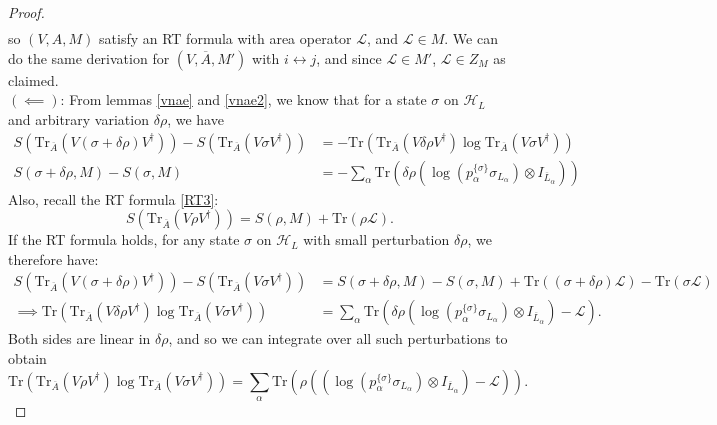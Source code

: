 \documentclass[12pt,a4paper]{report}
\numberwithin{equation}{section}
\newcommand{\ol}[1]{\overline{#1}}
\newcommand{\tr}{\text{Tr}}
\theoremstyle{definition}
\theoremstyle{theorem}
\theoremstyle{theorem}
\theoremstyle{example}
\theoremstyle{definition}
\begin{document}
\begin{proof}
\begin{equation}
\begin{aligned}
		\end{aligned}
	\end{equation}
	so $(V,A,M)$ satisfy an RT formula with area operator $\mathcal{L}$, and $\mathcal{L}\in M$. We can do the same derivation for $(V,\ol{A},M')$ with $i\leftrightarrow j$, and since $\mathcal{L}\in M'$, $\mathcal{L}\in Z_{M}$ as claimed.\\
	$(\impliedby)$: From lemmas \ref{vnae} and \ref{vnae2}, we know that for a state $\sigma$ on $\mathcal{H}_{L}$ and arbitrary variation $\delta\rho$, we have
	\begin{equation}
		\begin{aligned}
			S\left(\tr_{\ol{A}}\left(V(\sigma+\delta\rho)V^{\dagger}\right)\right)-S\left(\tr_{\ol{A}}\left(V\sigma V^{\dagger}\right)\right)&=-\tr\left(\tr_{\ol{A}}\left(V\delta\rho V^{\dagger}\right)\log \tr_{\ol{A}}\left(V\sigma V^{\dagger}\right)\right)\\
			S(\sigma+\delta\rho,M)-S(\sigma,M)&=-\sum_{\alpha}\tr\left(\delta\rho\left(\log\left( p_{\alpha}^{\{\sigma\}}\sigma_{L_{\alpha}}\right)\otimes I_{\ol{L}_{\alpha}}\right)\right)
		\end{aligned}
	\end{equation}
	Also, recall the RT formula \ref{RT3}:
	\begin{equation}
		S\left(\tr_{\ol{A}}\left(V\rho V^{\dagger}\right)\right)=S(\rho,M)+\tr(\rho\mathcal{L}).
	\end{equation}
	If the RT formula holds, for any state $\sigma$ on $\mathcal{H}_{L}$ with small perturbation $\delta\rho$, we therefore have:
	\begin{equation}
		\begin{aligned}
			S\left(\tr_{\ol{A}}\left(V(\sigma+\delta\rho)V^{\dagger}\right)\right)-S\left(\tr_{\ol{A}}\left(V\sigma V^{\dagger}\right)\right)&=S(\sigma+\delta\rho,M)-S(\sigma,M)+\tr((\sigma+\delta\rho)\mathcal{L})-\tr(\sigma\mathcal{L})\\
			\implies \tr\left(\tr_{\ol{A}}\left(V\delta\rho V^{\dagger}\right)\log\tr_{\ol{A}}\left(V\sigma V^{\dagger}\right)\right)&=\sum_{\alpha}\tr\left(\delta\rho\left(\log\left(p_{\alpha}^{\{\sigma\}}\sigma_{L_{\alpha}}\right)\otimes I_{\ol{L}_{\alpha}}\right)-\mathcal{L}\right).
		\end{aligned}
	\end{equation}
	Both sides are linear in $\delta\rho$, and so we can integrate over all such perturbations to obtain
	\begin{equation}\label{ph}
		\tr\left(\tr_{\ol{A}}\left(V\rho V^{\dagger}\right)\log\tr_{\ol{A}}\left(V\sigma V^{\dagger}\right)\right)=\sum_{\alpha}\tr\left(\rho\left(\left(\log\left(p_{\alpha}^{\{\sigma\}}\sigma_{L_{\alpha}}\right)\otimes I_{\ol{L}_{\alpha}}\right)-\mathcal{L}\right)\right).

\end{equation}
\end{proof}
\end{document}
